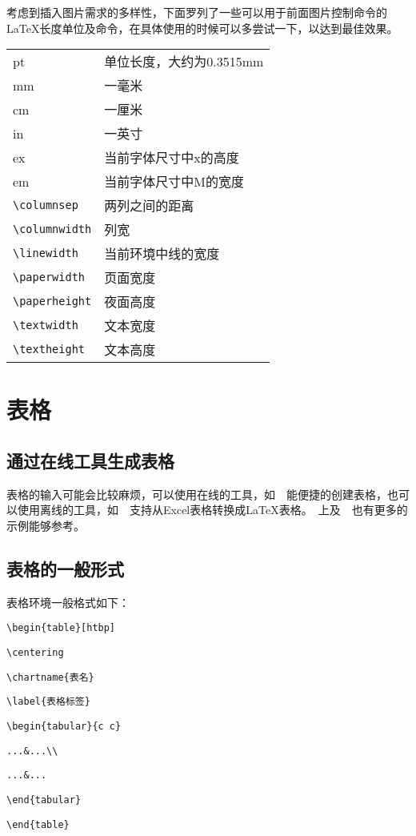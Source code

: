 考虑到插入图片需求的多样性，下面罗列了一些可以用于前面图片控制命令的\LaTeX 长度单位及命令，在具体使用的时候可以多尝试一下，以达到最佳效果。

\begin{tabular}{ll}
pt & 单位长度，大约为0.3515mm \\
mm & 一毫米 \\
cm & 一厘米 \\
in & 一英寸 \\
ex & 当前字体尺寸中x的高度 \\
em & 当前字体尺寸中M的宽度 \\
\verb|\columnsep| & 两列之间的距离 \\
\verb|\columnwidth| & 列宽 \\
\verb|\linewidth| & 当前环境中线的宽度 \\
\verb|\paperwidth| & 页面宽度 \\
\verb|\paperheight| & 夜面高度 \\
\verb|\textwidth| & 文本宽度 \\
\verb|\textheight| & 文本高度 \\
\end{tabular}

\section{表格}

\subsection{通过在线工具生成表格}

表格的输入可能会比较麻烦，可以使用在线的工具，如~~能便捷的创建表格，也可以使用离线的工具，如~~支持从Excel表格转换成\LaTeX{}表格。~上及~~也有更多的示例能够参考。

\subsection{表格的一般形式}

表格环境一般格式如下：

\verb|\begin{table}[htbp]|\par 
\verb|\centering|\par 
\verb|\chartname{表名}|\par 
\verb|\label{表格标签}|\par 
\verb|\begin{tabular}{c c}|\par 
\verb|...&...\\|\par 
\verb|...&...|\par 
\verb|\end{tabular}|\par 
\verb|\end{table}|\par 

